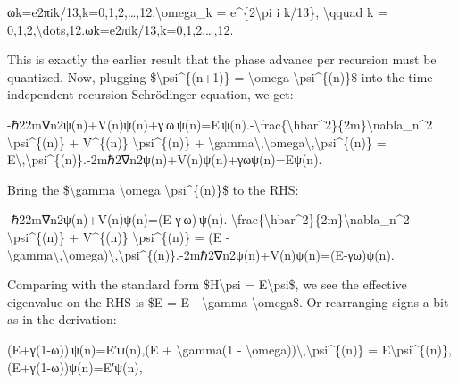 \documentclass[
]{article}
\begin{document}
ωk=e2πik/13,k=0,1,2,\ldots,12.\textbackslash omega\_k =
e\^{}\{2\textbackslash pi i k/13\}, \textbackslash qquad k =
0,1,2,\textbackslash dots,12.ωk\hspace{0pt}=e2πik/13,k=0,1,2,\ldots,12.\hspace{0pt}

This is exactly the earlier result that the phase advance per recursion
must be quantized. Now, plugging \$\textbackslash psi\^{}\{(n+1)\} =
\textbackslash omega \textbackslash psi\^{}\{(n)\}\$ into the
time-independent recursion Schrödinger equation, we get:

-ℏ22m∇n2ψ(n)+V(n)ψ(n)+γ ω ψ(n)=E ψ(n).-\textbackslash frac\{\textbackslash hbar\^{}2\}\{2m\}\textbackslash nabla\_n\^{}2
\textbackslash psi\^{}\{(n)\} + V\^{}\{(n)\}
\textbackslash psi\^{}\{(n)\} +
\textbackslash gamma\textbackslash,\textbackslash omega\textbackslash,\textbackslash psi\^{}\{(n)\}
=
E\textbackslash,\textbackslash psi\^{}\{(n)\}.-2mℏ2\hspace{0pt}∇n2\hspace{0pt}ψ(n)+V(n)ψ(n)+γωψ(n)=Eψ(n).

Bring the \$\textbackslash gamma \textbackslash omega
\textbackslash psi\^{}\{(n)\}\$ to the RHS:

-ℏ22m∇n2ψ(n)+V(n)ψ(n)=(E-γ ω) ψ(n).-\textbackslash frac\{\textbackslash hbar\^{}2\}\{2m\}\textbackslash nabla\_n\^{}2
\textbackslash psi\^{}\{(n)\} + V\^{}\{(n)\}
\textbackslash psi\^{}\{(n)\} = (E -
\textbackslash gamma\textbackslash,\textbackslash omega)\textbackslash,\textbackslash psi\^{}\{(n)\}.-2mℏ2\hspace{0pt}∇n2\hspace{0pt}ψ(n)+V(n)ψ(n)=(E-γω)ψ(n).\hspace{0pt}

Comparing with the standard form \$H\textbackslash psi =
E\textquotesingle\textbackslash psi\$, we see the effective eigenvalue
on the RHS is \$E\textquotesingle{} = E - \textbackslash gamma
\textbackslash omega\$. Or rearranging signs a bit as in the derivation:

(E+γ(1-ω)) ψ(n)=E′ψ(n),(E + \textbackslash gamma(1 -
\textbackslash omega))\textbackslash,\textbackslash psi\^{}\{(n)\} =
E\textquotesingle\textbackslash psi\^{}\{(n)\},(E+γ(1-ω))ψ(n)=E′ψ(n),
\end{document}
